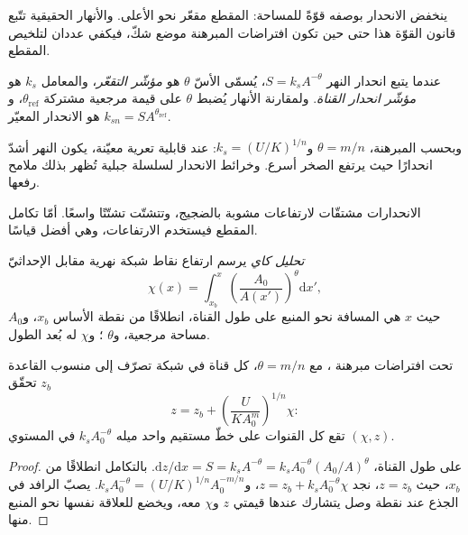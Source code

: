ينخفض الانحدار بوصفه قوّةً للمساحة: المقطع مقعّر نحو الأعلى. والأنهار الحقيقية
تتّبع قانون القوّة هذا حتى حين تكون افتراضات المبرهنة
موضع شكّ، فيكفي عددان لتلخيص المقطع.

\begin{definition}\label{def:b3:quantitative-geomorphology:indices}
عندما يتبع انحدار النهر $S = k_s A^{-\theta}$، يُسمّى الأسّ
$\theta$ هو \emph{مؤشّر التقعّر}، والمعامل
$k_s$ هو \emph{مؤشّر انحدار القناة}.
ولمقارنة الأنهار يُضبط $\theta$ على قيمة مرجعية مشتركة
$\theta_{\mathrm{ref}}$، و$k_{sn} = S A^{\theta_{\mathrm{ref}}}$ هو
الانحدار المعيّر.
\end{definition}

وبحسب المبرهنة، $\theta = m/n$ و$k_s = (U/K)^{1/n}$: عند قابلية تعرية معيّنة،
يكون النهر أشدّ انحدارًا حيث يرتفع الصخر أسرع. وخرائط الانحدار
لسلسلة جبلية تُظهر بذلك ملامح رفعها.


الانحدارات مشتقّات لارتفاعات مشوبة بالضجيج، وتتشتّت تشتّتًا واسعًا. أمّا
تكامل المقطع فيستخدم الارتفاعات، وهي أفضل قياسًا.

\begin{definition}\label{def:b3:quantitative-geomorphology:chi}
\emph{تحليل كاي} يرسم ارتفاع نقاط
شبكة نهرية مقابل الإحداثيّ
\[
\chi(x) = \int_{x_b}^{x} \left(\frac{A_0}{A(x')}\right)^{\theta}
\mathrm{d}x' ,
\]
حيث $x$ هي المسافة نحو المنبع على طول القناة، انطلاقًا من نقطة الأساس
$x_b$، و$A_0$ مساحة مرجعية، و$\theta$ ؛ و$\chi$ له
بُعد الطول.
\end{definition}

\begin{proposition}\label{prop:b3:quantitative-geomorphology:chi}
تحت افتراضات مبرهنة ، مع $\theta = m/n$،
كل قناة في شبكة تصرّف إلى منسوب القاعدة $z_b$ تحقّق
\[
z = z_b + \left(\frac{U}{K A_0^{m}}\right)^{1/n} \chi :
\]
تقع كل القنوات على خطّ مستقيم واحد ميله $k_s A_0^{-\theta}$ في
المستوي $(\chi, z)$.
\end{proposition}

\begin{proof}
على طول القناة، $\mathrm{d}z/\mathrm{d}x = S = k_s A^{-\theta} = k_s
A_0^{-\theta}(A_0/A)^{\theta}$. بالتكامل انطلاقًا من $x_b$، حيث $z = z_b$،
نجد $z = z_b + k_s A_0^{-\theta}\chi$، و$k_s A_0^{-\theta} =
(U/K)^{1/n} A_0^{-m/n}$. يصبّ الرافد في الجذع عند نقطة وصل يتشارك عندها
قيمتي $z$ و$\chi$ معه، ويخضع للعلاقة نفسها نحو المنبع منها.
\end{proof}

